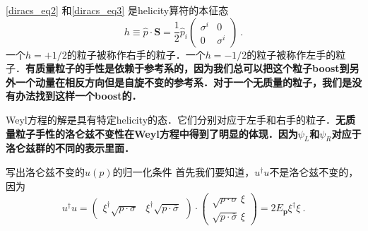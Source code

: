 \autoref{diracs_eq2} 和\autoref{diracs_eq3} 是helicity算符的本征态
\begin{equation}
h\equiv\hat p \cdot \mathbf S = \frac{1}{2} \hat p_i \begin{pmatrix}
\sigma^i & 0 \\
 0 & \sigma^i
\end{pmatrix}~.
\end{equation}
一个$h=+1/2$的粒子被称作右手的粒子．一个$h=-1/2$的粒子被称作左手的粒子．\textbf{有质量粒子的手性是依赖于参考系的，因为我们总可以把这个粒子boost到另外一个动量在相反方向但是自旋不变的参考系．对于一个无质量的粒子，我们是没有办法找到这样一个boost的．}

Weyl方程的解是具有特定helicity的态．它们分别对应于左手和右手的粒子．\textbf{无质量粒子手性的洛仑兹不变性在Weyl方程中得到了明显的体现．因为$\psi_L$和$\psi_R$对应于洛仑兹群的不同的表示里面．}

\begin{exercise}{写出洛仑兹不变的$u(p)$的归一化条件}
首先我们要知道，$u^\dagger u$不是洛仑兹不变的，因为\begin{equation}
u^\dagger u = \begin{pmatrix}
\xi^\dagger \sqrt{p\cdot\sigma} & \xi^\dagger \sqrt{p\cdot\bar\sigma}
\end{pmatrix}\cdot \begin{pmatrix}
\sqrt{p\cdot\sigma} \, \xi \\ 
\sqrt{p\cdot \bar\sigma} \, \xi
\end{pmatrix} = 2 E_{\mathbf p} \xi^\dagger \xi~.
\end{equation}
\end{exercise}











